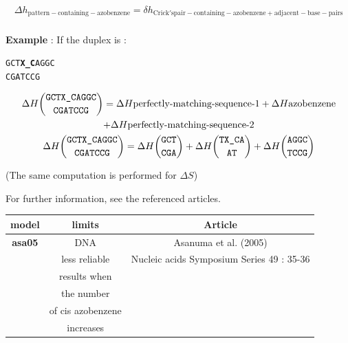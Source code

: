 \documentclass{article}
\begin{document}
\begin{multline*}
  \Delta{}h_\mathrm{pattern-containing-azobenzene} =
  \delta{}h_\mathrm{Crick's pair-containing-azobenzene+adjacent-base-pairs}\\
\end{multline*}

\textbf{Example} :
If the duplex is :
\begin{alltt}
GCT\textbf{X\_C}AGGC
CGATCCG
\end{alltt}
\begin{multline*}
\Delta H {\mbox{\texttt{GCTX\_CAGGC}} \choose \mbox{\texttt{CGATCCG}}} =
\Delta H {\mbox{perfectly-matching-sequence-1}} +
\Delta H {\mbox{azobenzene}} \\ +
\Delta H {\mbox{perfectly-matching-sequence-2}}\\
\Delta H {\mbox{\texttt{GCTX\_CAGGC}} \choose \mbox{\texttt{CGATCCG}}} =
\Delta H {\mbox{\texttt{GCT}} \choose \mbox{\texttt{CGA}}} +
\Delta H {\mbox{\texttt{TX\_CA}} \choose \mbox{\texttt{AT}}} +
\Delta H {\mbox{\texttt{AGGC}} \choose \mbox{\texttt{TCCG}}}\\
\end{multline*}

       (The same computation is performed for $\Delta S$) 
       
For further information, see the referenced articles.

\begin{table}[h][c]
\begin{tabular}[h]{| c | c | c |}
\textbf{model} & \textbf{limits} & \textbf{Article} \\
\hline
\textbf{asa05} & DNA & Asanuma et al. (2005) \\
 & less reliable & Nucleic acids Symposium Series 49 : 35-36 \\
 & results when & \\
 & the number & \\
 & of cis azobenzene & \\
 & increases & \\
 \hline
\end{tabular}
\end{table}
\end{document}
